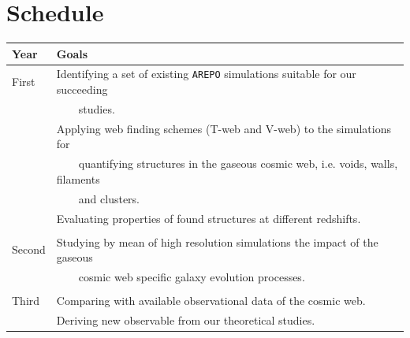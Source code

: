 \documentclass[a4,useAMS,usenatbib,usegraphicx,12pt]{article}
\begin{document}
\section{Schedule}

\begin{table}[h]
\begin{flushleft}
\begin{center}
  \begin{tabular}{l  l} \hline\hline
	\centering\textbf{Year} & \textbf{Goals} \\ \hline
	First  
	& \tabitem Identifying a set of existing \texttt{AREPO} simulations suitable 
	for our succeeding \\
	& \ \ \ \ studies. \\
	& \tabitem Applying web finding schemes (T-web and V-web) to the simulations 
	for\\
	& \ \ \ \ quantifying structures in the gaseous cosmic web, i.e. voids, walls, 
	filaments\\
	& \ \ \ \ and clusters.\\
	& \tabitem Evaluating properties of found structures at different redshifts.\\
	\\
	Second
	& \tabitem Studying by mean of high resolution simulations the impact of the 
	gaseous\\
	& \ \ \ \ cosmic web specific galaxy evolution processes.\\
	\\	
	Third
	& \tabitem Comparing with available observational data of the cosmic web.\\
	& \tabitem Deriving new observable from our theoretical studies.\\ 
	
	\hline\hline
  \end{tabular}  
\end{center}
\end{flushleft}
\end{table}



\renewcommand{\bibname}{8\ \ \ \ Bibliography}
\small

\end{document}
